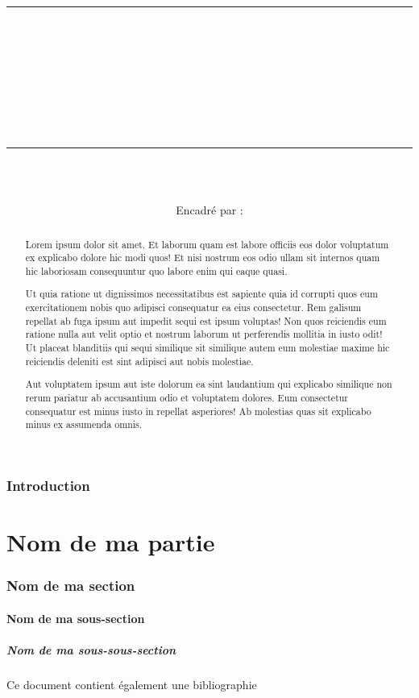 \documentclass[11pt]{article}
\date{\dateRapport}
\author{{\auteur} \\ \href{mailto:\email}{\email}
        \\[.3cm] Encadré par : \encadrant \\
        \href{mailto:\emailEncadrant}{\emailEncadrant}
}
\title{
    \vspace*{2cm}
    \href{https://ecoledesponts.fr/}{} \\
    \rule{\linewidth}{0.4pt} \\[0.3cm]
    \textbf{\textsc{\titre}} \\
    \sousTitre \\[0.1cm]
    \rule{\linewidth}{0.4pt}
}
\begin{document}
    \clearpage
    \maketitle
    \thispagestyle{empty}

    \begin{abstract}
        Lorem ipsum dolor sit amet. Et laborum quam est labore officiis eos dolor voluptatum ex explicabo dolore hic modi quos! Et nisi nostrum eos odio ullam sit internos quam hic laboriosam consequuntur quo labore enim qui eaque quasi.

        Ut quia ratione ut dignissimos necessitatibus est sapiente quia id corrupti quos eum exercitationem nobis quo adipisci consequatur ea eius consectetur. Rem galisum repellat ab fuga ipsum aut impedit sequi est ipsum voluptas! Non quos reiciendis eum ratione nulla aut velit optio et nostrum laborum ut perferendis mollitia in iusto odit! Ut placeat blanditiis qui sequi similique sit similique autem eum molestiae maxime hic reiciendis deleniti est sint adipisci aut nobis molestiae.

        Aut voluptatem ipsum aut iste dolorum ea sint laudantium qui explicabo similique non rerum pariatur ab accusantium odio et voluptatem dolores. Eum consectetur consequatur est minus iusto in repellat asperiores! Ab molestias quas sit explicabo minus ex assumenda omnis.
    \end{abstract}
    \newpage

    \tableofcontents

    \section*{Introduction}
    \newpage
    \part{Nom de ma partie}
    \section{Nom de ma section}
    \subsection{Nom de ma sous-section}
    \subsubsection{Nom de ma sous-sous-section}
    Ce document contient également une bibliographie \cite{overleaf_bibliography_management_2023}
    \date

    \newpage
    \printbibliography

    \label{LastPage}
        
\end{document}
